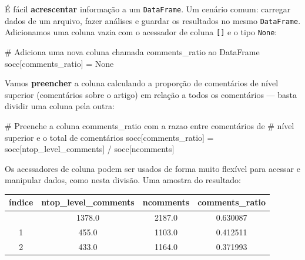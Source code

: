 \documentclass[
  brazilian,
  11pt,
]{article}
\newenvironment{Shaded}{\begin{snugshade}}{\end{snugshade}}
\newcommand{\CommentTok}[1]{\textcolor[rgb]{0.48,0.49,0.49}{#1}}
\newcommand{\NormalTok}[1]{\textcolor[rgb]{0.81,0.81,0.76}{#1}}
\newcommand{\OperatorTok}[1]{\textcolor[rgb]{0.81,0.81,0.76}{#1}}
\newcommand{\StringTok}[1]{\textcolor[rgb]{0.96,0.31,0.31}{#1}}
\newcommand{\VariableTok}[1]{\textcolor[rgb]{0.15,0.68,0.68}{#1}}
\newcounter{none} %
\let\oldtexttt\texttt
\renewcommand{\texttt}[1]{{\color{inlink}\oldtexttt{#1}}}
\begin{document}
É fácil \textbf{acrescentar} informação a um \texttt{DataFrame}. Um
cenário comum: carregar dados de um arquivo, fazer análises e guardar os
resultados no mesmo \texttt{DataFrame}. Adicionamos uma coluna vazia com
o acessador de coluna \texttt{{[}{]}} e o tipo \texttt{None}:

\begin{Shaded}
\begin{Highlighting}[]
\CommentTok{\# Adiciona uma nova coluna chamada \textquotesingle{}comments\_ratio\textquotesingle{} ao DataFrame}
\NormalTok{socc[}\StringTok{\textquotesingle{}comments\_ratio\textquotesingle{}}\NormalTok{] }\OperatorTok{=} \VariableTok{None}
\end{Highlighting}
\end{Shaded}

Vamos \textbf{preencher} a coluna calculando a proporção de comentários
de nível superior (comentários sobre o artigo) em relação a todos os
comentários --- basta dividir uma coluna pela outra:

\begin{Shaded}
\begin{Highlighting}[]
\CommentTok{\# Preenche a coluna \textquotesingle{}comments\_ratio\textquotesingle{} com a razao entre comentários de}
\CommentTok{\# nível superior e o total de comentários}
\NormalTok{socc[}\StringTok{\textquotesingle{}comments\_ratio\textquotesingle{}}\NormalTok{] }\OperatorTok{=}\NormalTok{ socc[}\StringTok{\textquotesingle{}ntop\_level\_comments\textquotesingle{}}\NormalTok{] }\OperatorTok{/}\NormalTok{ socc[}\StringTok{\textquotesingle{}ncomments\textquotesingle{}}\NormalTok{]}
\end{Highlighting}
\end{Shaded}

Os acessadores de coluna podem ser usados de forma muito flexível para
acessar e manipular dados, como nesta divisão. Uma amostra do resultado:

{\def\LTcaptype{none} %
\begin{longtable}[]{@{}cccc@{}}
\toprule\noalign{}
índice & ntop\_level\_comments & ncomments & comments\_ratio \\
\midrule\noalign{}
\endhead
\bottomrule\noalign{}
\endlastfoot
0 & 1378.0 & 2187.0 & 0.630087 \\
1 & 455.0 & 1103.0 & 0.412511 \\
2 & 433.0 & 1164.0 & 0.371993 \\
\end{longtable}
}
\end{document}
